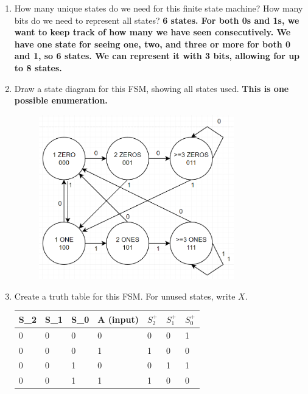 \documentclass{article}
\begin{document}
\begin{enumerate}[label=\alph*.]
\item How many unique states do we need for this finite state machine? How many bits do we need to represent all states?
\textbf{6 states. For both 0s and 1s, we want to keep track of how many we have seen consecutively. We have one state for seeing one, two, and three or more for both 0 and 1, so 6 states. We can represent it with 3 bits, allowing for up to 8 states. }
\item Draw a state diagram for this FSM, showing all states used.
\textbf{This is one possible enumeration.}
\begin{figure}[!h]
    \centering
    \includegraphics[width=0.8\textwidth]{figures/fsm1b-solution.png}
\end{figure}
\item Create a truth table for this FSM. For unused states, write $X$.
\begin{table}[!h]
\begin{tabular}{|l|l|l|l|l|l|l|}
\hline
S_2 & S_1 & S_0 & A (input) & $S_2^+$ & $S_1^+$ & $S_0^+$ \\ \hline
0    & 0    & 0    & 0         & 0                       & 0                       & 1                       \\ \hline
0    & 0    & 0    & 1         & 1                       & 0                       & 0                       \\ \hline
0    & 0    & 1    & 0         & 0                       & 1                       & 1                       \\ \hline
0    & 0    & 1    & 1         & 1                       & 0                       & 0                       \\ \hline

\end{tabular}
\end{table}
\end{enumerate}
\end{document}
